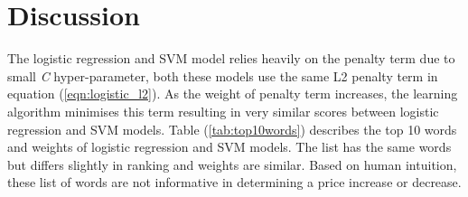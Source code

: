 \documentclass[transmag]{IEEEtran}
\begin{document}
\section{Discussion}
\noindent The logistic regression and SVM model relies heavily on the penalty term due to small \emph{C} hyper-parameter, both these models use the same L2 penalty term in equation (\ref{eqn:logistic_l2}). As the weight of penalty term increases, the learning algorithm minimises this term resulting in very similar scores between logistic regression and SVM models. Table (\ref{tab:top10words}) describes the top 10 words and weights of logistic regression and SVM models. The list has the same words but differs slightly in ranking and weights are similar. Based on human intuition, these list of words are not informative in determining a price increase or decrease.
\end{document}
